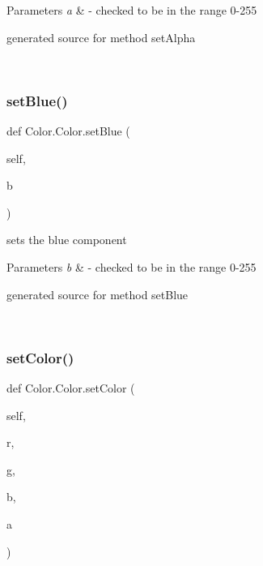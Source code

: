 \begin{DoxyParams}{Parameters}
{\em a} & -\/ checked to be in the range 0-\/255\begin{DoxyVerb}generated source for method setAlpha \end{DoxyVerb}
 \\
\hline
\end{DoxyParams}
\hypertarget{class_color_1_1_color_a2fad4bb66a79ba2b51acfa875f376c3b}{}\label{class_color_1_1_color_a2fad4bb66a79ba2b51acfa875f376c3b} 
\subsubsection{\texorpdfstring{set\+Blue()}{setBlue()}}
{\footnotesize\ttfamily def Color.\+Color.\+set\+Blue (\begin{DoxyParamCaption}\item[{}]{self,  }\item[{}]{b }\end{DoxyParamCaption})}



sets the blue component 


\begin{DoxyParams}{Parameters}
{\em b} & -\/ checked to be in the range 0-\/255\begin{DoxyVerb}generated source for method setBlue \end{DoxyVerb}
 \\
\hline
\end{DoxyParams}
\hypertarget{class_color_1_1_color_afa03ead21a88146b5ddbc89a53ffcda8}{}\label{class_color_1_1_color_afa03ead21a88146b5ddbc89a53ffcda8} 
\subsubsection{\texorpdfstring{set\+Color()}{setColor()}}
{\footnotesize\ttfamily def Color.\+Color.\+set\+Color (\begin{DoxyParamCaption}\item[{}]{self,  }\item[{}]{r,  }\item[{}]{g,  }\item[{}]{b,  }\item[{}]{a }\end{DoxyParamCaption})}



